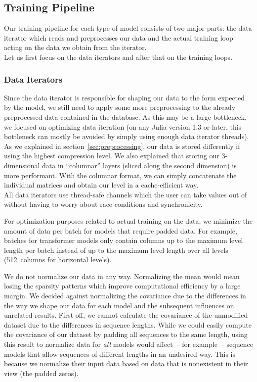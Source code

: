 \subsection{Training Pipeline}
\label{sec:training-pipeline}

Our training pipeline for each type of model consists of two major
parts: the data iterator which reads and preprocesses our data and the
actual training loop acting on the data we obtain from the iterator. \\
Let us first focus on the data iterators and after that on the
training loops.

\subsubsection{Data Iterators}

Since the data iterator is responsible for shaping our data to the
form expected by the model, we still need to apply some more
preprocessing to the already preprocessed data contained in the
database. As this may be a large bottleneck, we focused on optimizing
data iteration (on any Julia version 1.3 or later, this bottleneck can
mostly be avoided by simply using enough data iterator threads). As we
explained in section~\ref{sec:preprocessing}, our data is stored
differently if using the highest compression level. We also explained
that storing our 3-dimensional data in ``columnar'' layers (sliced
along the second dimension) is more performant. With the columnar
format, we can simply concatenate the individual matrices and obtain
our level in a cache-efficient way. \\
All data iterators use thread-safe channels which the user can take
values out of without having to worry about race conditions and
synchronicity.

For optimization purposes related to actual training on the data, we
minimize the amount of data per batch for models that require padded
data. For example, batches for transformer models only contain columns
up to the maximum level length per batch instead of up to the maximum
level length over all levels (512~columns for horizontal levels).

We do not normalize our data in any way. Normalizing the mean would
mean losing the sparsity patterns which improve computational
efficiency by a large margin. We decided against normalizing the
covariance due to the differences in the way we shape our data for
each model and the subsequent influences on unrelated results. First
off, we cannot calculate the covariance of the unmodified dataset due
to the differences in sequence lengths. While we could easily compute
the covariance of our dataset by padding all sequences to the same
length, using this result to normalize data for \emph{all} models
would affect~-- for example~-- sequence models that allow sequences of
different lengths in an undesired way. This is because we normalize
their input data based on data that is nonexistent in their view (the
padded zeros).

